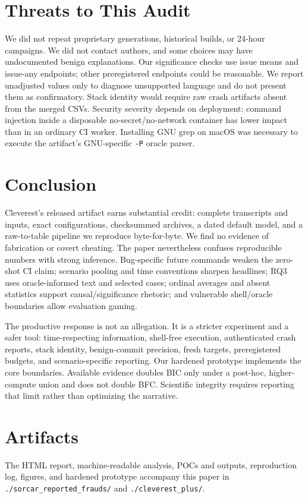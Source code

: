 \documentclass{article}
\begin{document}
\section{Threats to This Audit}

We did not repeat proprietary generations, historical builds, or 24-hour
campaigns.  We did not contact authors, and some choices may have undocumented
benign explanations.  Our significance checks use issue means and issue-any
endpoints; other preregistered endpoints could be reasonable.  We report
unadjusted values only to diagnose unsupported language and do not present them
as confirmatory.  Stack identity would require raw crash artifacts absent from
the merged CSVs.  Security severity depends on deployment: command injection
inside a disposable no-secret/no-network container has lower impact than in an
ordinary CI worker.  Installing GNU grep on macOS was necessary to execute the
artifact's GNU-specific \texttt{-P} oracle parser.

\section{Conclusion}

Cleverest's released artifact earns substantial credit: complete transcripts
and inputs, exact configurations, checksummed archives, a dated default model,
and a raw-to-table pipeline we reproduce byte-for-byte.  We find no evidence of
fabrication or covert cheating.  The paper nevertheless confuses reproducible
numbers with strong inference.  Bug-specific future commands weaken the
zero-shot CI claim; scenario pooling and time conventions sharpen headlines;
RQ3 uses oracle-informed text and selected cases; ordinal averages and absent
statistics support causal/significance rhetoric; and vulnerable shell/oracle
boundaries allow evaluation gaming.

The productive response is not an allegation.  It is a stricter experiment and
a safer tool: time-respecting information, shell-free execution, authenticated
crash reports, stack identity, benign-commit precision, fresh targets,
preregistered budgets, and scenario-specific reporting.  Our hardened prototype
implements the core boundaries.  Available evidence doubles BIC only under a
post-hoc, higher-compute union and does not double BFC.  Scientific integrity
requires reporting that limit rather than optimizing the narrative.

\section*{Artifacts}
The HTML report, machine-readable analysis, POCs and outputs, reproduction log,
figures, and hardened prototype accompany this paper in
\texttt{./sorcar\_reported\_frauds/} and \texttt{./cleverest\_plus/}.



\end{document}
